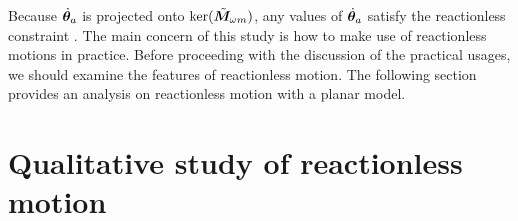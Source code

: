 Because ${\dot{\bm{\theta}}}_{a}$ is projected onto $\mathrm{ker}({\tilde{\bm{M}}}_{\omega m})$,
any values of ${\dot{\bm{\theta}}}_{a}$ satisfy the reactionless constraint .
The main concern of this study is how to make use of reactionless motions in practice.
Before proceeding with the discussion of the practical usages,
we should examine the features of reactionless motion.
The following section provides an analysis on reactionless motion with a planar model.



\section{Qualitative study of reactionless motion}

